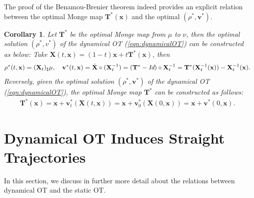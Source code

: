 \documentclass[11pt]{book}
\newtheorem{corollary}[theorem]{Corollary}
\begin{document}
The proof of the Benamou-Brenier theorem indeed provides an explicit relation between the optimal Monge map $\mathbf{T}^*(\mathbf{x})$ and the optimal $(\rho^*, \mathbf{v}^*)$.
\begin{corollary}
    Let $\mathbf{T}^*$ be the optimal Monge map from $\mu$ to $\nu$, then the optimal solution $(\rho^*, v^*)$ of the dynamical OT (\ref{eqn:dynamicalOT}) can be constructed as below: Take $\mathbf{X}(t,\mathbf{x}) = (1-t)\mathbf{x}+t\mathbf{T}^*(\mathbf{x})$, then
    \begin{align*}
        \rho^*(t,\mathbf{x})=(\mathbf{X}_t)_{\sharp}\mu, \quad \mathbf{v}^*(t,\mathbf{x}) = \dot{\mathbf{X}}\circ(\mathbf{X}_t^{-1}) = (\mathbf{T}^*-\emph{Id})\circ \mathbf{X}_t^{-1} = \mathbf{T}^*(\mathbf{X}_t^{-1}(\mathbf{x})) - \mathbf{X}_t^{-1}(\mathbf{x}).
    \end{align*}
    Reversely, given the optimal solution $(\rho^*, \mathbf{v}^*)$ of the dynamical OT (\ref{eqn:dynamicalOT}), the optimal Monge map $\mathbf{T}^*$ can be constructed as follows:
    \begin{align*}
        \mathbf{T}^*(\mathbf{x}) = \mathbf{x} + \mathbf{v}^*_t(\mathbf{X}(t,\mathbf{x})) = \mathbf{x} + \mathbf{v}^*_0(\mathbf{X}(0,\mathbf{x})) = \mathbf{x} + \mathbf{v}^*(0,\mathbf{x}).
    \end{align*}
\end{corollary}






\section[Straight Trajectories]{Dynamical OT Induces Straight Trajectories}

In this section, we discuss in further more detail about the relations between dynamical OT and the static OT. 
\end{document}
